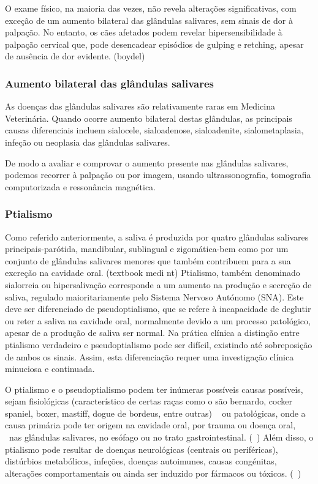O exame físico, na maioria das vezes, não revela alterações significativas, com exceção de um aumento bilateral das glândulas salivares, sem sinais de dor à palpação. No entanto, os cães afetados podem revelar hipersensibilidade à palpação cervical que, pode desencadear episódios de gulping e retching, apesar de ausência de dor evidente. (boydel)

\subsubsection{Aumento bilateral das glândulas salivares} 

As doenças das glândulas salivares são relativamente raras em Medicina Veterinária. Quando ocorre aumento bilateral destas glândulas, as principais causas diferenciais incluem sialocele, sialoadenose, sialoadenite, sialometaplasia, infeção ou neoplasia das glândulas salivares.


De modo a avaliar e comprovar o aumento presente nas glândulas salivares, podemos recorrer à palpação ou por imagem, usando ultrassonografia, tomografia computorizada e ressonância magnética.

\subsubsection{Ptialismo} 

Como referido anteriormente, a saliva é produzida por quatro glândulas salivares principais-parótida, mandibular, sublingual e zigomática-bem como por um conjunto de glândulas salivares menores que também contribuem para a sua excreção na cavidade oral. (textbook medi nt)
Ptialismo, também denominado sialorreia ou hipersalivação corresponde a um aumento na produção e secreção de saliva, regulado maioritariamente pelo Sistema Nervoso Autónomo (SNA). Este deve ser diferenciado de pseudoptialismo, que se refere à incapacidade de deglutir ou reter a saliva na cavidade oral, normalmente devido a um processo patológico, apesar de a produção de saliva ser normal.
 Na prática clínica a distinção entre ptialismo verdadeiro e pseudoptialismo pode ser difícil, existindo até sobreposição de ambos os sinais. Assim, esta diferenciação requer uma investigação clínica minuciosa e continuada. ~\cite{bsava_2020_gastro}


O ptialismo e o pseudoptialismo podem ter inúmeras possíveis causas possíveis, sejam fisiológicas (característico de certas raças como o são bernardo, cocker spaniel, boxer, mastiff, dogue de bordeus, entre outras) ~\cite{canine_gastro_2013} ou patológicas, onde a causa primária pode ter origem na cavidade oral, por trauma ou doença oral, ~\cite{canine_gastro_2013}nas glândulas salivares, no esófago ou no trato gastrointestinal. (~\cite{Kook2013}) Além disso, o ptialismo pode resultar de doenças neurológicas (centrais ou periféricas), distúrbios metabólicos, infeções, doenças autoimunes, causas congénitas, alterações comportamentais ou ainda ser induzido por fármacos ou tóxicos. (~\cite{Kook2013}) 


